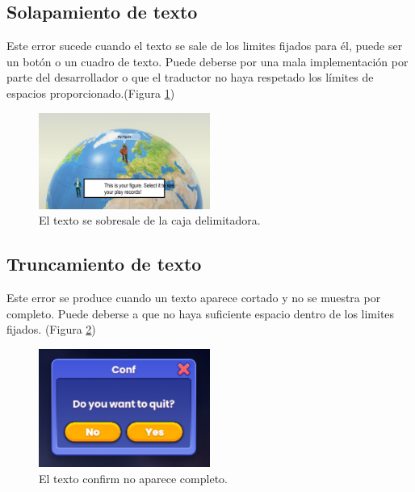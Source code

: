 \subsection{Solapamiento de texto}\label{ErrorSolapamiento}
Este error sucede cuando el texto se sale de los limites fijados para él, puede ser un botón o un cuadro de texto. Puede deberse por una mala implementación por parte del desarrollador o que el traductor no haya respetado los límites de espacios proporcionado.(Figura \ref{fig:E_Solapa})
\begin{figure}[H]
	\centering
	\includegraphics[width = 0.5\textwidth]{Imagenes/Errores_Localizacion/E_Solapamiento.png}
	\caption{El texto se sobresale de la caja delimitadora.}
	\label{fig:E_Solapa}
\end{figure}

\subsection{Truncamiento de texto}\label{ErrorTruncamiento}
Este error se produce cuando un texto aparece cortado y no se muestra por completo. Puede deberse a que no haya suficiente espacio dentro de los limites fijados.
(Figura \ref{fig:E_Trunc})
\begin{figure}[H]
	\centering
	\includegraphics[width = 0.5\textwidth]{Imagenes/Errores_Localizacion/E_Trunca.png}
	\caption{El texto confirm no aparece completo.}
	\label{fig:E_Trunc}
\end{figure}

